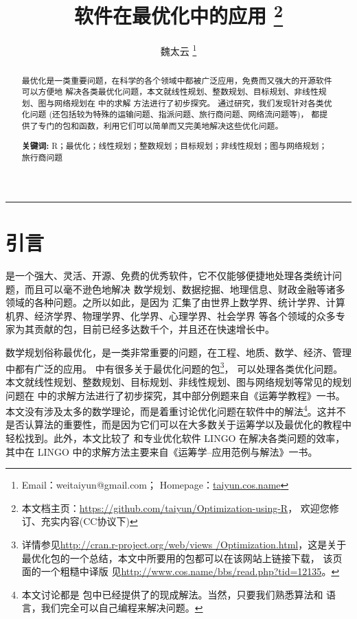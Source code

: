 \documentclass{article}
\begin{document}
\title{\heiti \R 软件在最优化中的应用 
\thanks{本文档主页：\url{https://github.com/taiyun/Optimization-using-R}，
欢迎您修订、充实内容(CC协议下)}  }

\author{魏太云 \thanks{
	Email：weitaiyun@gmail.com；
	Homepage：\url{taiyun.cos.name} }}
\date{}
\maketitle

\begin{abstract}
最优化是一类重要问题，在科学的各个领域中都被广泛应用，免费而又强大的开源软件 \R 可以方便地
解决各类最优化问题，本文就线性规划、整数规划、目标规划、非线性规划、图与网络规划在 \R 中的求解
方法进行了初步探究。
通过研究，我们发现针对各类优化问题 (还包括较为特殊的运输问题、指派问题、旅行商问题、网络流问题等)，
\R 都提供了专门的包和函数，利用它们可以简单而又完美地解决这些优化问题。


\begin{flushleft}
\textbf{关键词:} R；最优化；线性规划；整数规划；目标规划；非线性规划；图与网络规划；旅行商问题

\end{flushleft}
\end{abstract}
\noindent\rule[0.15\baselineskip]{\textwidth}{1.5pt}
\tableofcontents
\newpage
\section{引言}
\R \citep{R08}是一个强大、灵活、开源、免费的优秀软件，它不仅能够便捷地处理各类统计问题，而且可以毫不逊色地解决
数学规划、数据挖掘、地理信息、财政金融等诸多领域的各种问题。之所以如此，是因为
 \R 汇集了由世界上数学界、统计学界、计算机界、经济学界、物理学界、化学界、心理学界、社会学界
等各个领域的众多专家为其贡献的包，目前已经多达数千个，并且还在快速增长中。

数学规划俗称最优化，是一类非常重要的问题，在工程、地质、数学、经济、管理中都有广泛的应用。
\R 中有很多关于最优化问题的包\footnote{详情参见\url{http://cran.r-project.org/web/views
/Optimization.html}，这是关于最优化包的一个总结，本文中所要用的包都可以在该网站上链接下载，
该页面的一个粗糙中译版%
见\url{http://www.cos.name/bbs/read.php?tid=12135}。}，
可以处理各类优化问题。本文就线性规划、整数规划、目标规划、非线性规划、图与网络规划等常见的规划问题在 \R 中的求解方法进行了初步探究，其中部分例题来自《运筹学教程》\citep{Op07}一书。
本文没有涉及太多的数学理论，而是着重讨论优化问题在软件中的解法\footnote{本文讨论都是 \R 包中已经提供了的现成解法。当然，只要我们熟悉算法和 \R 语言，我们完全可以自己编程来解决问题。}。这并不是否认算法的重要性，而是因为它们可以在大多数关于运筹学以及最优化的教程中轻松找到。此外，本文比较了 \R 和专业优化软件 LINGO 在解决各类问题的效率，其中在 LINGO 中的求解方法主要来自《运筹学--应用范例与解法》\citep{OP06}一书。
\end{document}
